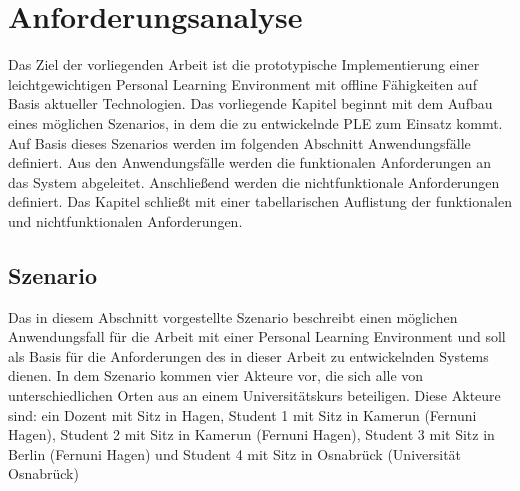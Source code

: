 \newcommand{\requirementOfflineWork}{Das System muss den Anwender in die Lage versetzen mit den gewählten Services, zumindest rudimentär, offline zu arbeiten.}
\newcommand{\requirementOnlineSync}{Bei einer Verbindung mit dem Internet müssen die offline vorgenommenen Arbeiten mit den Services synchronisiert werden.}
\newcommand{\requirementAggregator}{Das System muss als Aggregator für unterschiedliche externe Kanäle und Services dienen und dem Anwender die Arbeit mit ihnen an zentraler Stelle ermöglichen.}
\newcommand{\requirementWidgetStandard}{Die Services müssen über einen frei verfügbaren Standard in das System eingebunden werden können.}
\newcommand{\requirementUsbStick}{Die durchgeführten Arbeiten müssen offline zwischen unterschiedlichen Rechnern transportiert werden können.}
\newcommand{\requirementUsageInBrowser}{Das System muss in aktuellen Browsern mit nativen Browsertechnologien ohne weitere Installation nutzbar sein.}
\newcommand{\requirementExtensibility}{Das System muss einfach erweitert werden können.}
\newcommand{\requirementNewWidgetsWithApi}{Es muss möglich sein über eine API oder eine vorgegebene Implementierung neue Services und Kanäle mit offline Fähigkeiten in das System zu laden.}
\newcommand{\requirementExampleWidget}{Es muss ein offline fähiges Widget entwickelt werden, welches die offline Funktionalitäten beispielhaft umsetzt.}
\newcommand{\requirementOpenSource}{Es dürfen keine proprietären, sondern nur freie Technologien für die Umsetzung des Systems genutzt werden.}

\chapter{Anforderungsanalyse}\label{chapter:Kapitel3}  

Das Ziel der vorliegenden Arbeit ist die prototypische Implementierung einer leichtgewichtigen Personal Learning Environment mit offline Fähigkeiten auf Basis aktueller Technologien. Das vorliegende Kapitel beginnt mit dem Aufbau eines möglichen Szenarios, in dem die zu entwickelnde PLE zum Einsatz kommt. Auf Basis dieses Szenarios werden im folgenden Abschnitt Anwendungsfälle definiert. Aus den Anwendungsfälle werden die funktionalen Anforderungen an das System abgeleitet. Anschließend werden die nichtfunktionale Anforderungen definiert. Das Kapitel schließt mit einer tabellarischen Auflistung der funktionalen und nichtfunktionalen Anforderungen. 

\section{Szenario}\label{section:szenario}
Das in diesem Abschnitt vorgestellte Szenario beschreibt einen möglichen Anwendungsfall für die Arbeit mit einer Personal Learning Environment und soll als Basis für die Anforderungen des in dieser Arbeit zu entwickelnden Systems dienen. In dem Szenario kommen vier Akteure vor, die sich alle von unterschiedlichen Orten aus an einem Universitätskurs beteiligen. Diese Akteure sind: ein Dozent mit Sitz in Hagen, Student 1 mit Sitz in Kamerun (Fernuni Hagen), Student 2 mit Sitz in Kamerun (Fernuni Hagen), Student 3 mit Sitz in Berlin (Fernuni Hagen) und Student 4 mit Sitz in Osnabrück (Universität Osnabrück) 

